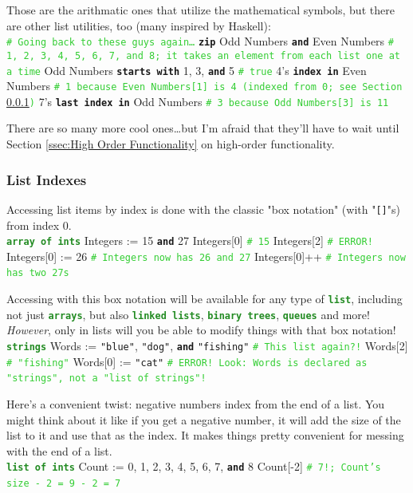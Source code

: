 \documentclass{article}
\newcommand{\sssecl}[1]{\subsubsection{#1}\label{sssec:#1}}
\newcommand{\codecomment}[1]{\texttt{\textcolor{LimeGreen}{#1}}}
\newcommand{\commentline}[1]{\codecomment{\# #1}}
\newcommand{\type}[1]{\texttt{\textcolor{ForestGreen}{\textbf{#1}}}}
\newcommand{\common}[1]{\texttt{\textcolor{Mulberry}{\textbf{#1}}}}
\newcommand{\codestring}[1]{\texttt{\textcolor{NavyBlue}{"#1"}}}
\newenvironment{code}[0]
{\ttfamily{}				%
\setlength\parindent{0cm}	%
~\\}
{\setlength\parindent{1cm}
~\\}
\begin{document}
\indent Those are the arithmatic ones that utilize the mathematical symbols, but there are other list utilities, too (many inspired by Haskell):
\begin{code}
\commentline{Going back to these guys again\ldots}
\common{zip} Odd Numbers \common{and} Even Numbers \commentline{1, 2, 3, 4, 5, 6, 7, and 8; it takes an element from each list one at a time}
Odd Numbers \common{starts with} 1, 3, \common{and} 5 \commentline{true}
4's \common{index in} Even Numbers \commentline{1 because Even Numbers[1] is 4 (indexed from 0; see Section \ref{sssec:List Indexes})}
7's \common{last index in} Odd Numbers \commentline{3 because Odd Numbers[3] is 11}
\end{code}

\indent There are so many more cool ones\ldots but I'm afraid that they'll have to wait until Section \ref{ssec:High Order Functionality} on high-order functionality.

\sssecl{List Indexes}
\indent Accessing list items by index is done with the classic "box notation" (with "\texttt{[]}"s) from index 0.
\begin{code}
\type{array of ints} Integers := 15 \common{and} 27
Integers[0]	\commentline{15}
Integers[2] \commentline{ERROR!}
Integers[0] := 26	\commentline{Integers now has 26 and 27}
Integers[0]++	\commentline{Integers now has two 27s}
\end{code}

\indent Accessing with this box notation will be available for any type of \type{list}, including not just \type{arrays}, but also \type{linked lists}, \type{binary trees}, \type{queues} and more! \emph{However}, only in lists will you be able to modify things with that box notation!
\begin{code}
\type{strings} Words := \codestring{blue}, \codestring{dog}, \common{and} \codestring{fishing} \commentline{This list again?!}
Words[2] \commentline{"fishing"}
Words[0] := \codestring{cat} \commentline{ERROR! Look: Words is declared as "strings", not a "list of strings"!}
\end{code}

\indent Here's a convenient twist: negative numbers index from the end of a list. You might think about it like if you get a negative number, it will add the size of the list to it and use that as the index. It makes things pretty convenient for messing with the end of a list.
\begin{code}
\type{list of ints} Count := 0, 1, 2, 3, 4, 5, 6, 7, \common{and} 8
Count[-2] \commentline{7!; Count's size - 2 = 9 - 2 = 7}
\end{code}
\end{document}
